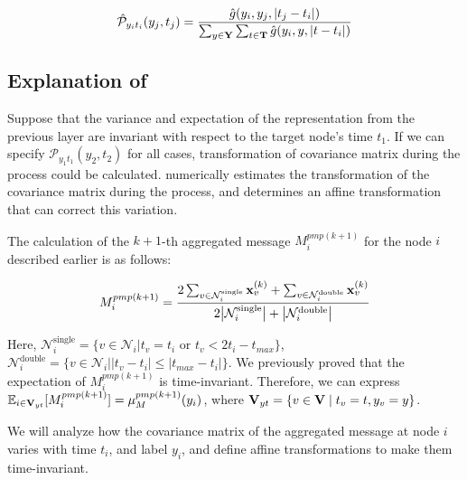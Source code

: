 \begin{align}
\hat{\mathcal P}_{y_i t_i}(y_j, t_j)={\hat{g}(y_i, y_j, |t_j-t_i|)\over \sum_{y\in \bold{Y}}\sum_{t\in\bold{T}}\hat{g}(y_i, y, |t-t_i|)}
\end{align}













\subsection{Explanation of \PNY}
\label{apdx:PNY}
Suppose that the variance and expectation of the representation from the previous layer are invariant with respect to the target node's time $t_1$. If we can specify $\mathcal{P}_{y_1 t_1}(y_2, t_2)$ for all cases, transformation of covariance matrix during the \PMP process could be calculated. \PNY numerically estimates the transformation of the covariance matrix during the \PMP process, and determines an affine transformation that can correct this variation.

The calculation of the $k+1$-th aggregated message $M_{i}^{pmp(k+1)}$ for the node $i$ described earlier is as follows:

\begin{align}
M_{i}^{pmp(k+1)} = {{2\sum_{v\in \mathcal{N}^{\text{single}}_i} \bold{x}_{v}^{(k)}+\sum_{v\in \mathcal{N}^{\text{double}}_i} \bold{x}_{v}^{(k)}}\over{2\big|\mathcal{N}^{\text{single}}_i\big| + \big|\mathcal{N}^{\text{double}}_i\big|}}
\end{align}

Here, $\mathcal{N}^{\text{single}}_i=\{v\in \mathcal{N}_i \big| t_v=t_i \text{ or }  t_v < 2t_i - t_{max} \}$, $\mathcal{N}^{\text{double}}_i=\{v\in \mathcal{N}_i\big| | t_v-t_i|\le| t_{max} - t_i | \}$. We previously proved that the expectation of $M_{i}^{pmp(k+1)}$ is time-invariant. Therefore, we can express $\mathbb{E}_{i\in \bold{V}_{yt}} [ M_i^{pmp (k+1)}] =\mu_{M}^{pmp(k+1)}(y_i)$, where $\bold{V}_{yt}= \{v\in \bold{V} \mid t_v = t, y_v = y\}$.

We will analyze how the covariance matrix of the aggregated message at node $i$ varies with time $t_i$, and label $y_i$, and define affine transformations to make them time-invariant.

